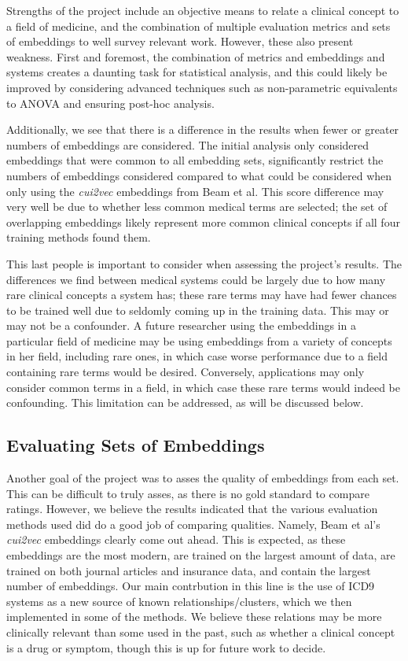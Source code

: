 \documentclass[10pt]{article}
\begin{document}
Strengths of the project include an objective means to relate a clinical concept to a field of medicine, and the combination of multiple evaluation metrics and sets of embeddings to well survey relevant work. However, these also present weakness. First and foremost, the combination of metrics and embeddings and systems creates a daunting task for statistical analysis, and this could likely be improved by considering advanced techniques such as non-parametric equivalents to ANOVA and ensuring post-hoc analysis. 

Additionally, we see that there is a difference in the results when fewer or greater numbers of embeddings are considered. The initial analysis only considered embeddings that were common to all embedding sets, significantly restrict the numbers of embeddings considered compared to what could be considered when only using the \emph{cui2vec} embeddings from Beam et al. This score difference may very well be due to whether less common medical terms are selected; the set of overlapping embeddings likely represent more common clinical concepts if all four training methods found them. 

This last people is important to consider when assessing the project's results. The differences we find between medical systems could be largely due to how many rare clinical concepts a system has; these rare terms may have had fewer chances to be trained well due to seldomly coming up in the training data. This may or may not be a confounder. A future researcher using the embeddings in a particular field of medicine may be using embeddings from a variety of concepts in her field, including rare ones, in which case worse performance due to a field containing rare terms would be desired. Conversely, applications may only consider common terms in a field, in which case these rare terms would indeed be confounding. This limitation can be addressed, as will be discussed below. 

\subsection{Evaluating Sets of Embeddings}

Another goal of the project was to asses the quality of embeddings from each set. This can be difficult to truly asses, as there is no gold standard to compare ratings. However, we believe the results indicated that the various evaluation methods used did do a good job of comparing qualities. Namely, Beam et al's \emph{cui2vec} embeddings clearly come out ahead. This is expected, as these embeddings are the most modern, are trained on the largest amount of data, are trained on both journal articles and insurance data, and contain the largest number of embeddings. Our main contrbution in this line is the use of ICD9 systems as a new source of known relationships/clusters, which we then implemented in some of the methods. We believe these relations may be more clinically relevant than some used in the past, such as whether a clinical concept is a drug or symptom, though this is up for future work to decide. 
\end{document}
